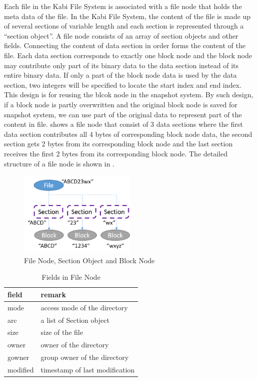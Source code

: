     Each file in the Kabi File System is associated with a file node that holds the meta data of the file. In the Kabi File System, the content of the file is made up of several sections of variable length and each section is represented through a ``section object''. A file node consists of an array of section objects and other fields. Connecting the content of data section in order forms the content of the file. Each data section corresponds to exactly one block node and the block node may contribute only part of its binary data to the data section instead of its entire binary data. If only a part of the block node data is used by the data section, two integers will be specified to locate the start index and end index. This design is for reusing the blcok node in the snapshot system. By such design, if a block node is partly overwritten and the original block node is saved for snapshot system, we can use part of the original data to represent part of the content in file.  shows a file node that consist of 3 data sections where the first data section contributes all 4 bytes of corresponding block node data, the second section gets 2 bytes from its corresponding block node and the last section receives the first 2 bytes from its corresponding block node. The detailed structure of a file node is shown in .

\begin{figure}[hbtp]
\centering
\includegraphics[width=0.5\textwidth]{Chapter-3/figs/fig7.png}
\caption{File Node, Section Object and Block Node}
\label{fig:file_and_section}
\end{figure}


\begin{table}
\caption{Fields in File Node}
\label{tab:file_fields}
\begin{center}
\begin{tabular}{ll}
\toprule
field & remark\\
\midrule
mode & access mode of the directory\\
arc & a list of Section object\\
size & size of the file\\
owner & owner of the directory\\
gowner & group owner of the directory\\
modified & timestamp of last modification\\
\bottomrule
\end{tabular}
\end{center}
\end{table}

